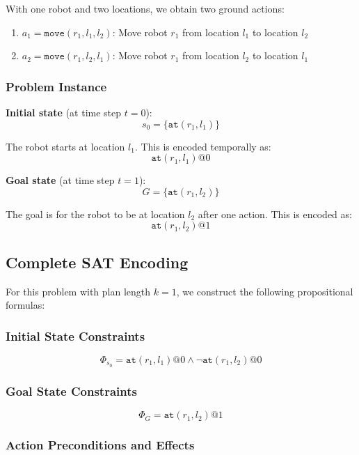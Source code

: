 \documentclass[11pt,a4paper]{article}
\theoremstyle{definition}
\theoremstyle{plain}
\theoremstyle{remark}
\begin{document}
With one robot and two locations, we obtain two ground actions:

\begin{enumerate}
    \item $a_1 = \texttt{move}(r_1, l_1, l_2)$: Move robot $r_1$ from location $l_1$ to location $l_2$
    \item $a_2 = \texttt{move}(r_1, l_2, l_1)$: Move robot $r_1$ from location $l_2$ to location $l_1$
\end{enumerate}

\subsubsection{Problem Instance}

\textbf{Initial state} (at time step $t = 0$):
\[
s_0 = \{\texttt{at}(r_1, l_1)\}
\]

The robot starts at location $l_1$. This is encoded temporally as:
\[
\texttt{at}(r_1, l_1)@0
\]

\textbf{Goal state} (at time step $t = 1$):
\[
G = \{\texttt{at}(r_1, l_2)\}
\]

The goal is for the robot to be at location $l_2$ after one action. This is encoded as:
\[
\texttt{at}(r_1, l_2)@1
\]

\subsection{Complete SAT Encoding}

For this problem with plan length $k = 1$, we construct the following propositional formulas:

\subsubsection{Initial State Constraints}

\[
\Phi_{s_0} = \texttt{at}(r_1, l_1)@0 \land \neg \texttt{at}(r_1, l_2)@0
\]

\subsubsection{Goal State Constraints}

\[
\Phi_G = \texttt{at}(r_1, l_2)@1
\]

\subsubsection{Action Preconditions and Effects}
\end{document}
